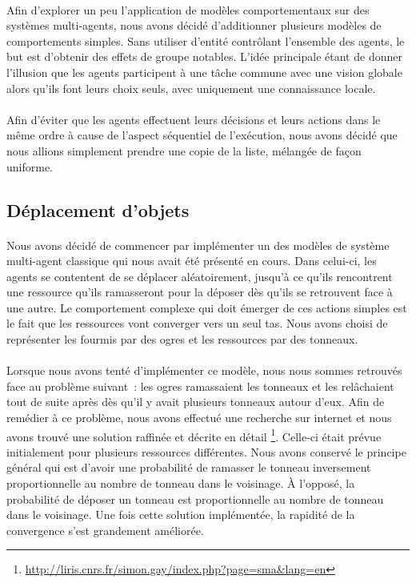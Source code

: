 \paragraph{}
Afin d'explorer un peu l'application de modèles comportementaux sur des
systèmes multi-agents, nous avons décidé d'additionner plusieurs modèles
de comportements simples. Sans utiliser d'entité contrôlant l'ensemble des
agents, le but est d'obtenir des effets de groupe notables. L'idée principale
étant de donner l'illusion que les agents participent à une tâche commune
avec une vision globale alors qu'ils font leurs choix seuls, avec uniquement
une connaissance locale.

\paragraph{}
Afin d'éviter que les agents effectuent leurs décisions et leurs actions dans
le même ordre à cause de l'aspect séquentiel de l'exécution, nous avons décidé
que nous allions simplement prendre une copie de la liste, mélangée de façon
uniforme.

\subsection{Déplacement d'objets}
\paragraph{}
Nous avons décidé de commencer par implémenter un des modèles de système
multi-agent classique qui nous avait été présenté en cours. Dans celui-ci, les
agents se contentent de se déplacer aléatoirement, jusqu'à ce qu'ils
rencontrent une ressource qu'ils ramasseront pour la déposer dès qu'ils se
retrouvent face à une autre. Le comportement complexe qui doit émerger de ces
actions simples est le fait que les ressources vont converger vers un seul tas.
Nous avons choisi de représenter les fourmis par des ogres et les ressources par
des tonneaux.

\paragraph{}
Lorsque nous avons tenté d'implémenter ce modèle, nous nous sommes retrouvés
face au problème suivant~: les ogres ramassaient les tonneaux et les
relâchaient tout de suite après dès qu'il y avait plusieurs tonneaux autour
d'eux. Afin de remédier à ce problème, nous avons effectué une recherche sur
internet et nous avons trouvé une solution raffinée et décrite en détail
\footnote{\url{http://liris.cnrs.fr/simon.gay/index.php?page=sma&lang=en}}.
Celle-ci était prévue initialement pour plusieurs ressources différentes. Nous
avons conservé le principe général qui est d'avoir une probabilité de ramasser
le tonneau inversement proportionnelle au nombre de tonneau dans le voisinage. À
l'opposé, la probabilité de déposer un tonneau est proportionnelle au nombre
de tonneau dans le voisinage. Une fois cette solution implémentée, la rapidité
de la convergence s'est grandement améliorée.

